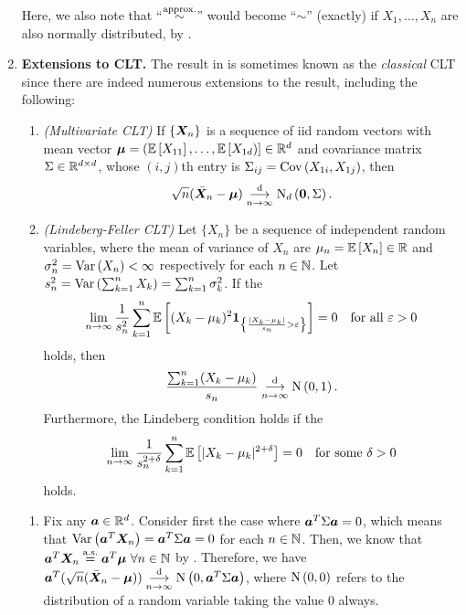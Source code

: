 \begin{enumerate}
\begin{remark}
Here, we also note that ``\(\overset{\text{approx.}}\sim\)'' would become ``\(\sim\)'' (exactly)
if \(X_1,\dotsc,X_n\) are also normally distributed, by .
\end{remark}
\item \textbf{Extensions to CLT.} The result in  is sometimes
known as the \emph{classical} CLT since there are indeed numerous extensions to
the result, including the following:
\begin{enumerate}
\item\label{it:mult-clt} \emph{(Multivariate CLT)}
If \(\{\bm{X}_n\}\) is a sequence of iid random vectors with mean vector
\(\bm{\mu}=(\mathbb{E}\left[X_{11}\right],\dotsc,\mathbb{E}\left[X_{1d})\right]\in\mathbb{R}^{d}\)
and covariance matrix \(\Sigma\in\mathbb{R}^{d\times d}\), whose \((i,j)\)th entry
is \(\Sigma_{ij}=\operatorname{Cov}\left(X_{1i},X_{1j}\right)\), then
\[
\sqrt{n}(\bar{\bm{X}}_n-\bm{\mu})\underset{n\to\infty}{\overset{\text{d}}{\longrightarrow}} \operatorname{N}_{d}\left(\bm{0},\Sigma\right).
\]
\item\label{it:lindeberg-feller-clt} \emph{(Lindeberg-Feller CLT)} Let \(\{X_n\}\)
be a sequence of independent random variables, where the mean of variance of
\(X_n\) are \(\mu_n=\mathbb{E}\left[X_n\right]\in\mathbb{R}\) and \(\sigma_n^{2}=\operatorname{Var}\left(X_n\right)<\infty\)
respectively for each \(n\in\mathbb{N}\). Let
\(s_n^{2}=\operatorname{Var}\left(\sum_{k=1}^{n}X_k\right)=\sum_{k=1}^{n}\sigma_{k}^{2}\). If the
\[
\lim_{n\to\infty}\frac{1}{s_{n}^{2}}\sum_{k=1}^{n}\mathbb{E}\left[(X_{k}-\mu_{k})^{2}
\mathbf{1}_{\left\{\frac{|X_k-\mu_{k}|}{s_n}>\varepsilon\right\}}\right]
=0\quad\text{for all \(\varepsilon>0\)}
\]
holds, then
\[
\frac{\sum_{k=1}^{n}(X_{k}-\mu_{k})}{s_n}\underset{n\to\infty}{\overset{\text{d}}{\longrightarrow}} \operatorname{N}\left(0,1\right).
\]
Furthermore, the Lindeberg condition holds if the 
\[
\lim_{n\to\infty}\frac{1}{s_n^{2+\delta}}
\sum_{k=1}^{n}\mathbb{E}\left[|X_k-\mu_{k}|^{2+\delta}\right]=0
\quad\text{for some \(\delta>0\)}
\]
holds.
\end{enumerate}
\begin{pf}
\begin{enumerate}
\item Fix any \(\bm{a}\in\mathbb{R}^{d}\). Consider first the case where
\(\bm{a}^{T}\Sigma\bm{a}=0\), which means that
\(\operatorname{Var}\left(\bm{a}^{T}\bm{X}_n\right)=\bm{a}^{T}\Sigma\bm{a}=0\) for each
\(n\in\mathbb{N}\). Then, we know that \(\bm{a}^{T}\bm{X}_n\overset{\text{a.s.}}=
\bm{a}^{T}\bm{\mu}~\forall n\in\mathbb{N}\) by .
Therefore, we have \(\bm{a}^{T}(\sqrt{n}(\bar{\bm{X}}_n-\bm{\mu})) \underset{n\to\infty}{\overset{\text{d}}{\longrightarrow}}
\operatorname{N}\left(0,\bm{a}^{T}\Sigma\bm{a}\right)\), where \(\operatorname{N}\left(0,0\right)\) refers to the
distribution of a random variable taking the value \(0\) always.


\end{enumerate}
\end{pf}
\end{enumerate}

